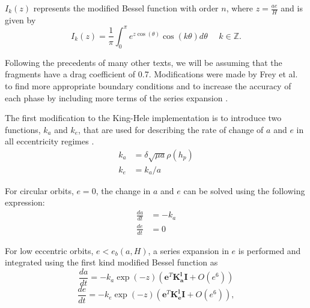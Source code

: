 \documentclass[a4paper, 12pt]{article}
\begin{document}
$I_k(z)$ represents the modified Bessel function with order $n$, where $z = \frac{ae}{H}$ and is given by
$$
I_k(z) = \dfrac{1}{\pi} \int_{0}^{\pi} e^{z\cos(\theta)}\cos(k\theta)d\theta \:\:\:\:\:\: k \in \mathbb{Z}.
$$

Following the precedents of many other texts, we will be assuming that the fragments have a drag coefficient of 0.7. Modifications were made by Frey et al. to find more appropriate boundary conditions and to increase the accuracy of each phase by including more terms of the series expansion \citep{frey_extension_2019}.

The first modification to the King-Hele implementation is to introduce two functions, $k_a$  and $k_e$, that are used for describing the rate of change of $a$ and $e$ in all eccentricity regimes \citep{frey_extension_2019}.
\begin{equation*}
	\begin{aligned}
	k_a &=  \delta \sqrt{\mu a}\rho(h_p)\\
	k_e &= k_a / a
	\end{aligned}
\end{equation*}


For circular orbits, $e = 0$, the change in $a$ and $e$ can be solved using the following expression:
\begin{equation*}
	\begin{aligned}
		\frac{da}{dt} &= -k_a\\
		\frac{de}{dt} &= 0
	\end{aligned}
\end{equation*}

For low eccentric orbits, $e < e_b(a, H)$, a series expansion in $e$ is performed and integrated using the first kind modified Bessel function as
\begin{equation}
		\frac{da}{dt}  = -k_a \exp(-z) (\boldsymbol{e}^T \boldsymbol{K_a^l} \boldsymbol{I} + O(e^6))
\end{equation}
\begin{equation}
	\frac{de}{dt}  = -k_e \exp(-z) (\boldsymbol{e}^T \boldsymbol{K_e^l} \boldsymbol{I} + O(e^6)),
\end{equation}
\end{document}
